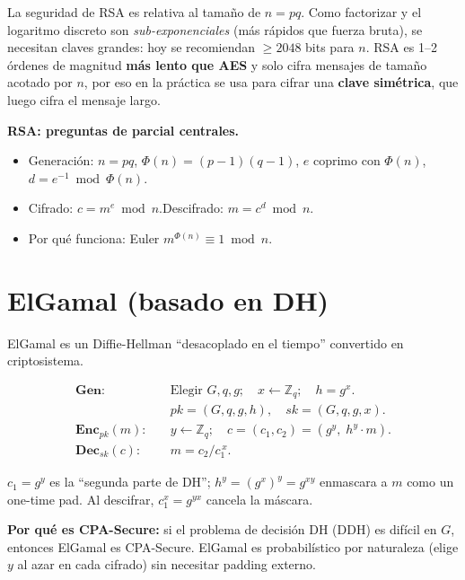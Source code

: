 \documentclass[11pt,a4paper]{article}
\begin{document}
La seguridad de RSA es relativa al tamaño de $n = pq$. Como factorizar y el
logaritmo discreto son \emph{sub-exponenciales} (más rápidos que fuerza bruta),
se necesitan claves grandes: hoy se recomiendan $\ge 2048$ bits para $n$.
RSA es 1--2 órdenes de magnitud \textbf{más lento que AES} y solo cifra mensajes
de tamaño acotado por $n$, por eso en la práctica se usa para cifrar una
\textbf{clave simétrica}, que luego cifra el mensaje largo.

\begin{examen}
\textbf{RSA: preguntas de parcial centrales.}
\begin{itemize}[leftmargin=1.4em,nosep]
  \item Generación: $n=pq$, $\Phi(n)=(p-1)(q-1)$, $e$ coprimo con $\Phi(n)$,
  $d=e^{-1}\bmod\Phi(n)$.
  \item Cifrado: $c=m^e\bmod n$.\qquad Descifrado: $m=c^d\bmod n$.
  \item Por qué funciona: Euler $m^{\Phi(n)}\equiv 1\bmod n$.
\end{itemize}
\end{examen}

\section{ElGamal (basado en DH)}

ElGamal es un Diffie-Hellman ``desacoplado en el tiempo'' convertido en criptosistema.

\begin{align*}
\textbf{Gen:} &\quad
  \text{Elegir } G, q, g;\quad x \leftarrow \mathbb{Z}_q;\quad h = g^x.\\
  &\quad pk = (G, q, g, h),\quad sk = (G, q, g, x).\\[4pt]
\textbf{Enc}_{pk}(m): &\quad
  y \leftarrow \mathbb{Z}_q;\quad c = (c_1, c_2) = (g^y,\; h^y \cdot m).\\[4pt]
\textbf{Dec}_{sk}(c): &\quad
  m = c_2 / c_1^{\,x}.
\end{align*}

$c_1 = g^y$ es la ``segunda parte de DH''; $h^y = (g^x)^y = g^{xy}$ enmascara a $m$
como un one-time pad. Al descifrar, $c_1^x = g^{yx}$ cancela la máscara.

\begin{destacado}
\textbf{Por qué es CPA-Secure:} si el problema de decisión DH (DDH) es difícil en
$G$, entonces ElGamal es CPA-Secure. ElGamal es probabilístico por naturaleza (elige
$y$ al azar en cada cifrado) sin necesitar padding externo.
\end{destacado}
\end{document}
